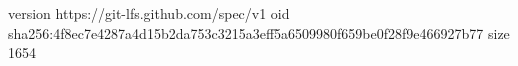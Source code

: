 version https://git-lfs.github.com/spec/v1
oid sha256:4f8ec7e4287a4d15b2da753c3215a3eff5a6509980f659be0f28f9e466927b77
size 1654
